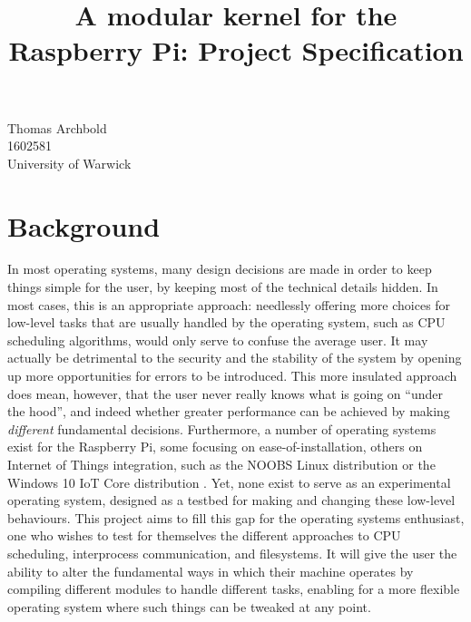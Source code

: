 \documentclass[10pt,a4paper]{article}
\title{A modular kernel for the Raspberry Pi: Project Specification}
\begin{document}
\maketitle

\begin{center}
    Thomas Archbold \\
    1602581 \\
    University of Warwick \\
\end{center}

\section*{Background}
In most operating systems, many design decisions are made in order to keep
things simple for the user, by keeping most of the technical details hidden. In
most cases, this is an appropriate approach: needlessly offering more choices
for low-level tasks that are usually handled by the operating system, such as
CPU scheduling algorithms, would only serve to confuse the average user. It may
actually be detrimental to the security and the stability of the system by
opening up more opportunities for errors to be introduced.  This more insulated
approach does mean, however, that the user never really knows what is going on
``under the hood'', and indeed whether greater performance can be achieved by
making \textit{different} fundamental decisions.  Furthermore, a number of
operating systems exist for the Raspberry Pi, some focusing on
ease-of-installation, others on Internet of Things integration, such as the
NOOBS \cite{NOOBS} Linux distribution or the Windows 10 IoT Core distribution
\cite{IoT}. Yet, none exist to serve as an experimental operating system,
designed as a testbed for making and changing these low-level behaviours.  This
project aims to fill this gap for the operating systems enthusiast, one who
wishes to test for themselves the different approaches to CPU scheduling,
interprocess communication, and filesystems. It will give the user the ability
to alter the fundamental ways in which their machine operates by compiling
different modules to handle different tasks, enabling for a more flexible
operating system where such things can be tweaked at any point.
\end{document}
